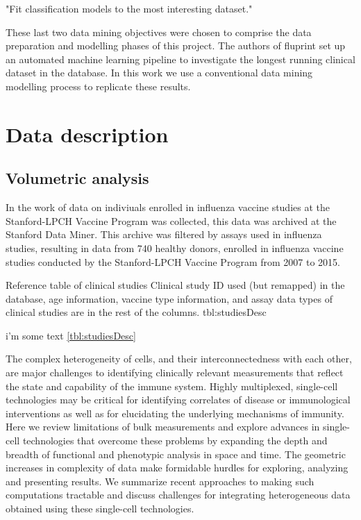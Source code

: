 \begin{displayquote}
"Fit classification models to the most interesting dataset."
\end{displayquote}

These last two data mining objectives were chosen to comprise the data
preparation and modelling phases of this project. The authors of fluprint set
up an automated machine learning pipeline to investigate the longest running
clinical dataset in the database. In this work we use a conventional data
mining modelling process to replicate these results.

\section{Data description}

\subsection{Volumetric analysis}

In the work of \cite{tomicFluPRINTDatasetMultidimensional2019} data on
indiviuals enrolled in influenza vaccine studies at the Stanford-LPCH Vaccine
Program was collected, this data was archived at the Stanford Data Miner. This
archive was filtered by assays used in influenza studies, resulting in data
from 740 healthy donors, enrolled in influenza vaccine studies conducted by the
Stanford-LPCH Vaccine Program from 2007 to 2015.

{Reference table of clinical studies}
{Clinical study ID used (but remapped) in the database, age information,
vaccine type information, and assay data types of clinical studies are in the
rest of the columns.}
{tbl:studiesDesc}


i'm some text \autoref{tbl:studiesDesc}

\citep{chattopadhyaySinglecellTechnologiesMonitoring2014}
The complex heterogeneity of cells, and their interconnectedness with each
other, are major challenges to identifying clinically relevant measurements
that reflect the state and capability of the immune system. Highly multiplexed,
single-cell technologies may be critical for identifying correlates of disease
or immunological interventions as well as for elucidating the underlying
mechanisms of immunity. Here we review limitations of bulk measurements and
explore advances in single-cell technologies that overcome these problems by
expanding the depth and breadth of functional and phenotypic analysis in space
and time. The geometric increases in complexity of data make formidable hurdles
for exploring, analyzing and presenting results. We summarize recent approaches
to making such computations tractable and discuss challenges for integrating
heterogeneous data obtained using these single-cell technologies.

